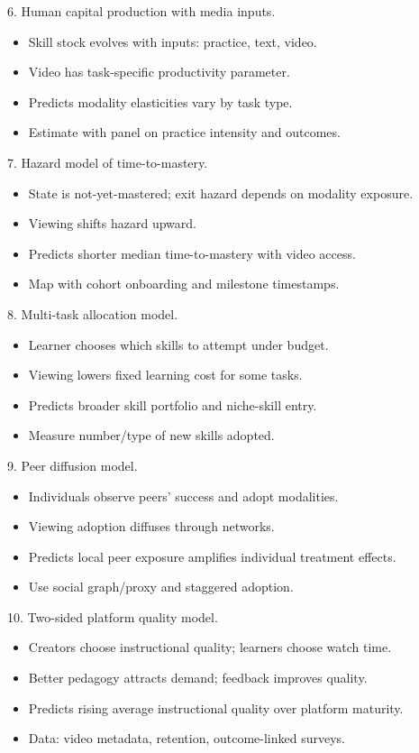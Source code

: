 \documentclass[11pt]{article}
\begin{document}
6. Human capital production with media inputs.\\
\begin{itemize}
\item Skill stock evolves with inputs: practice, text, video.
\item Video has task-specific productivity parameter.
\item Predicts modality elasticities vary by task type.
\item Estimate with panel on practice intensity and outcomes.
\end{itemize}

7. Hazard model of time-to-mastery.\\
\begin{itemize}
\item State is not-yet-mastered; exit hazard depends on modality exposure.
\item Viewing shifts hazard upward.
\item Predicts shorter median time-to-mastery with video access.
\item Map with cohort onboarding and milestone timestamps.
\end{itemize}

8. Multi-task allocation model.\\
\begin{itemize}
\item Learner chooses which skills to attempt under budget.
\item Viewing lowers fixed learning cost for some tasks.
\item Predicts broader skill portfolio and niche-skill entry.
\item Measure number/type of new skills adopted.
\end{itemize}

9. Peer diffusion model.\\
\begin{itemize}
\item Individuals observe peers' success and adopt modalities.
\item Viewing adoption diffuses through networks.
\item Predicts local peer exposure amplifies individual treatment effects.
\item Use social graph/proxy and staggered adoption.
\end{itemize}

10. Two-sided platform quality model.\\
\begin{itemize}
\item Creators choose instructional quality; learners choose watch time.
\item Better pedagogy attracts demand; feedback improves quality.
\item Predicts rising average instructional quality over platform maturity.
\item Data: video metadata, retention, outcome-linked surveys.
\end{itemize}
\end{document}

